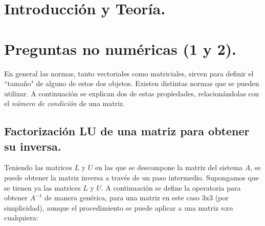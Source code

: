 \documentclass[12pt, notitlepage]{article}
\begin{document}
\clearpage
\setcounter{page}{1}

\section{Introducción y Teoría.}



\newpage

\section{Preguntas no numéricas (1 y 2).}
En general las normas, tanto vectoriales como matriciales, sirven para definir el ``tamaño" de alguno de estos dos objetos. Existen distintas normas que se pueden utilizar. A continuación se explican dos de estas propiedades, relacionándolas con el \textit{número de condición} de una matriz.

\subsection{Factorización LU de una matriz para obtener su inversa.}

Teniendo las matrices $L$ y $U$ en las que se descompone la matriz del sistema $A$, se puede obtener la matriz inversa a través de un paso intermedio. Supongamos que se tienen ya las matrices $L$ y $U$. A continuación se define la operatoria para obtener $A^{-1}$ de manera genérica, para una matriz en este caso $3\text{x}3$ (por simplicidad), aunque el procedimiento se puede aplicar a una matriz $n\text{x}n$ cualquiera:
\end{document}
